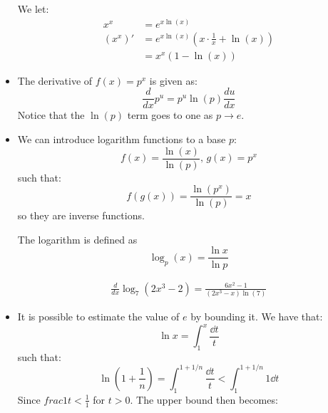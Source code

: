 \begin{itemize}
\begin{example}
        We let:
        \begin{align}
            x^x &= e^{x\ln(x)} \\
            (x^x)' &= e^{x\ln(x)}\left(x\cdot \frac{1}{x}+\ln(x)\right) \\ 
            &= x^x(1-\ln(x)) 
        \end{align}
    \end{example}
    \item The derivative of $f(x)=p^x$ is given as:
    \begin{equation}
        \frac{d}{dx}p^u = p^u \ln(p)\frac{du}{dx}
    \end{equation}
    Notice that the $\ln(p)$ term goes to one as $p\to e$.
    \item We can introduce logarithm functions to a base $p$:
    \begin{equation}
        f(x) = \frac{\ln(x)}{\ln(p)},\, g(x)=p^x
        \label{eq:}
    \end{equation}
    such that:
    \begin{equation}
        f(g(x)) = \frac{\ln(p^x)}{\ln(p)} = x
        \label{eq:}
    \end{equation}
    so they are inverse functions.
    \begin{definition}
        The logarithm is defined as
        \begin{equation}
            \log_{p}(x) = \frac{\ln x}{\ln p}
        \end{equation}
    \end{definition}
    \begin{example}
        \begin{align}
            \frac{d}{dx} \log_{7}(2x^3-2) = \frac{6x^2-1}{(2x^3-x)\ln(7)}
        \end{align}
    \end{example}
    \item It is possible to estimate the value of $e$ by bounding it. We have that:
    \begin{equation}
        \ln x = \int_1^x \frac{\dd{t}}{t}
        \label{eq:}
    \end{equation}
    such that:
    \begin{equation}
        \ln\left(1+\frac{1}{n}\right) = \int_1^{1+1/n} \frac{\dd{t}}{t} < \int_1^{1+1/n} 1 \dd{t}
        \label{eq:}
    \end{equation}
    Since $frac{1}{t} < \frac{1}{1}$ for $t>0$. The upper bound then becomes:
    \begin{equation}

\end{equation}
\end{itemize}
